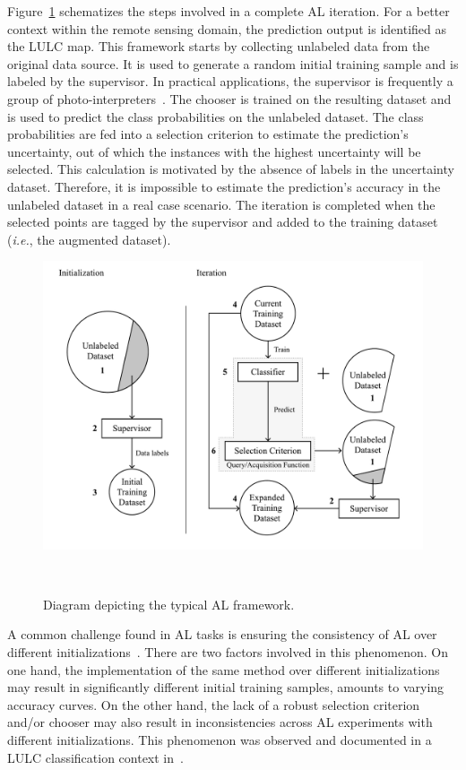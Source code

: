 \documentclass[remotesensing,article,submit,moreauthors,pdftex]{Definitions/mdpi}
\begin{document}
Figure~\ref{fig:al_typical} schematizes the steps involved in a complete AL
iteration. For a better context within the remote sensing domain, the
prediction output is identified as the LULC map. This framework starts by
collecting unlabeled data from the original data source. It is used to
generate a random initial training sample and is labeled by the supervisor. In
practical applications, the supervisor is frequently a group of
photo-interpreters~\cite{Kottke2017}. The chooser is trained on the resulting
dataset and is used to predict the class probabilities on the unlabeled
dataset. The class probabilities are fed into a selection criterion to
estimate the prediction's uncertainty, out of which the instances with the
highest uncertainty will be selected. This calculation is motivated by the
absence of labels in the uncertainty dataset. Therefore, it is impossible to
estimate the prediction's accuracy in the unlabeled dataset in a real case
scenario. The iteration is completed when the selected points are tagged by
the supervisor and added to the training dataset (\textit{i.e.}, the augmented
dataset). 

\begin{figure}[htb]
	\centering
	\includegraphics[width=\linewidth]{../analysis/al_typical}
	\caption{Diagram depicting the typical AL framework.
    }~\label{fig:al_typical}
\end{figure}

A common challenge found in AL tasks is ensuring the consistency of AL over
different initializations~\cite{Kottke2017}. There are two factors involved in
this phenomenon. On one hand, the implementation of the same method over
different initializations may result in significantly different initial
training samples, amounts to varying accuracy curves. On the other hand, the
lack of a robust selection criterion and/or chooser may also result in
inconsistencies across AL experiments with different initializations. This
phenomenon was observed and documented in a LULC classification context
in~\cite{tuia2011using}.
\end{document}
